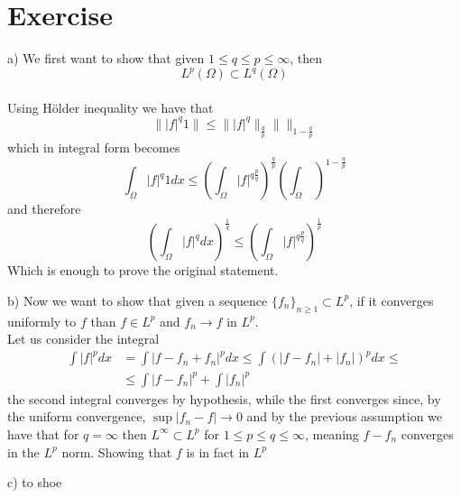 \documentclass{article}
\begin{document}
\section{Exercise}
a) We first want to show that given $1 \leq q \leq p \leq \infty$, then 
\[
    L^p(\Omega) \subset L^q(\Omega)
\]
\\
Using Hölder inequality we have that
\[
    \| |f|^q 1 \| \leq \| |f|^q \|_{\frac{q}{p}} \| \|_{1-\frac{q}{p}} 
\]
which in integral form becomes
\[
    \int_\Omega |f|^q 1 dx \leq \left( \int_\Omega |f|^{q \frac{p}{q}} \right)^{\frac{q}{p}} \left( \int_\Omega \ \right)^{1-\frac{q}{p}}
\]
and therefore
\[
    \left(\int_\Omega |f|^q dx \right)^\frac{1}{q} \leq \left( \int_\Omega |f|^{q \frac{p}{q}} \right)^{\frac{1}{p}}
\]
Which is enough to prove the original statement.

b) Now we want to show that given a sequence $\{ f_n \}_{n \geq 1} \subset L^p$, if it converges uniformly to $f$ than $f \in L^p$ and $f_n \to f$ in $L^p$.\\
Let us consider the integral
\[
    \begin{split}
        \int |f|^p dx &= \int |f- f_n + f_n|^p dx \leq \int (|f-f_n| + |f_n|)^p dx \leq \\
        &\leq \int |f-f_n|^p + \int |f_n|^p 
    \end{split}
\]
the second integral converges by hypothesis, while the first converges since, by the uniform convergence, $\sup |f_n - f| \to 0 $ and by the previous assumption we have that for $q = \infty$ then $L^\infty \subset L^p$ for $1 \leq p \leq q \leq \infty$, meaning $f-f_n$ converges in the $L^p$ norm. Showing that $ f$ is in fact in $L^p$

c) to shoe
\end{document}
